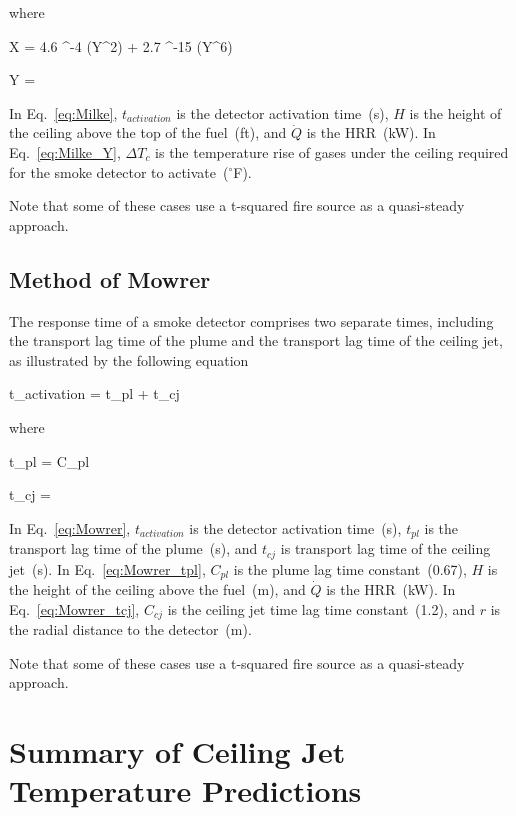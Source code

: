 \noindent where

\be
X = 4.6 ^{-4} (Y^2) + 2.7 ^{-15} (Y^6)
\label{eq:Milke_X}
\ee

\be
Y = 
\label{eq:Milke_Y}
\ee

In Eq.~\ref{eq:Milke}, $t_{activation}$ is the detector activation time~(s), $H$ is the height of the ceiling above the top of the fuel~(ft), and $\dot Q$ is the HRR~(kW). In Eq.~\ref{eq:Milke_Y}, $\Delta T_c$ is the temperature rise of gases under the ceiling required for the smoke detector to activate~($^\circ$F).

Note that some of these cases use a t-squared fire source as a quasi-steady approach.


\clearpage


\subsection{Method of Mowrer}

The response time of a smoke detector comprises two separate times, including the transport lag time of the plume and the transport lag time of the ceiling jet, as illustrated by the following equation

\be
t_{activation} = t_{pl} + t_{cj}
\label{eq:Mowrer}
\ee

\noindent where

\be
t_{pl} = C_{pl} 
\label{eq:Mowrer_tpl}
\ee

\be
t_{cj} =  
\label{eq:Mowrer_tcj}
\ee

In Eq.~\ref{eq:Mowrer}, $t_{activation}$ is the detector activation time~(s), $t_{pl}$ is the transport lag time of the plume~(s), and $t_{cj}$ is transport lag time of the ceiling jet~(s). In Eq.~\ref{eq:Mowrer_tpl}, $C_{pl}$ is the plume lag time constant~(0.67), $H$ is the height of the ceiling above the fuel~(m), and $\dot Q$ is the HRR~(kW). In Eq.~\ref{eq:Mowrer_tcj}, $C_{cj}$ is the ceiling jet time lag time constant~(1.2), and $r$ is the radial distance to the detector~(m).

Note that some of these cases use a t-squared fire source as a quasi-steady approach.


\clearpage


\section{Summary of Ceiling Jet Temperature Predictions}

